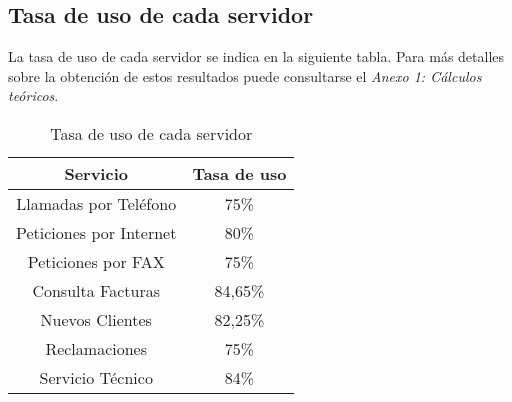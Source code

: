 \subsection{Tasa de uso de cada servidor}
La tasa de uso de cada servidor se indica en la siguiente tabla. Para más detalles sobre la obtención de estos resultados puede consultarse el \textit{Anexo 1: Cálculos teóricos}.\\
\begin{table}[H]
  \begin{center}
  \begin{tabular}{|c|c|}
    \hline
    \textbf{Servicio}       & \textbf{Tasa de uso} \\ \hline
    Llamadas por Teléfono   & 75\%                   \\ \hline
    Peticiones por Internet & 80\%                  \\ \hline
    Peticiones por FAX      & 75\%                   \\ \hline
    Consulta Facturas      & 84,65\%                   \\ \hline
    Nuevos Clientes      & 82,25\%                   \\ \hline
    Reclamaciones      & 75\%                   \\ \hline
    Servicio Técnico      & 84\%                  \\ \hline
  \end{tabular}
\end{center}
  \caption{Tasa de uso de cada servidor}
  \end{table}
